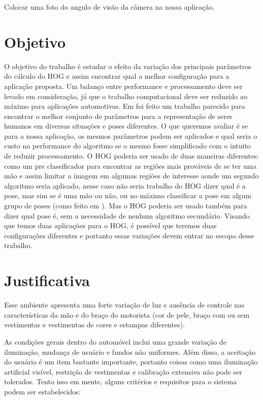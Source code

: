 \todo Colocar uma foto do angulo de visão da câmera na nossa aplicação.

\section{Objetivo}

O objetivo do trabalho é estudar o efeito da variação dos principais parâmetros do cálculo do HOG e assim encontrar qual a melhor configuração para a aplicação proposta. Um balanço entre performance e processamento deve ser levado em consideração, já que o trabalho computacional deve ser reduzido ao máximo para aplicações automotivas.
Em \cite{} foi feito um trabalho parecido para encontrar o melhor conjunto de parâmetros para a representação de seres humanos em diversas situações e poses diferentes. O que queremos avaliar é se para a nossa aplicação, os mesmos parâmetros podem ser aplicados e qual seria o custo na performance do algoritmo se o mesmo fosse simplificado com o intuito de reduzir processamento.
O HOG poderia ser usado de duas maneiras diferentes: como um pre classificador para encontrar as regiões mais prováveis de se ter uma mão e assim limitar a imagem em algumas regiões de interesse aonde um segundo algoritmo seria aplicado, nesse caso não seria trabalho do HOG dizer qual é a pose, mas sim se é uma mão ou não, ou no máximo classificar a pose em algum grupo de poses (como feito em \cite{ref10}). Mas o HOG poderia ser usado também para dizer qual pose é, sem a necessidade de nenhum algoritmo secundário.
Visando que temos duas aplicações para o HOG, é possível que teremos duas configurações diferentes e portanto essas variações devem entrar no escopo desse trabalho.

\section{Justificativa}

Esse ambiente apresenta uma forte variação de luz e ausência de controle nas características da mão e do braço do motorista (cor de pele, braço com ou sem vestimentas e vestimentas de cores e estampas diferentes). 

As condições gerais dentro do automóvel inclui uma grande variação de iluminação, mudança de usuário e fundos não uniformes. Além disso, a aceitação do usuário é um item bastante importante, portanto coisas como uma iluminação artificial visível, restrição de vestimentas e calibração extensiva não pode ser tolerados. Tento isso em mente, alguns critérios e requisitos para o sistema podem ser estabelecidos:

